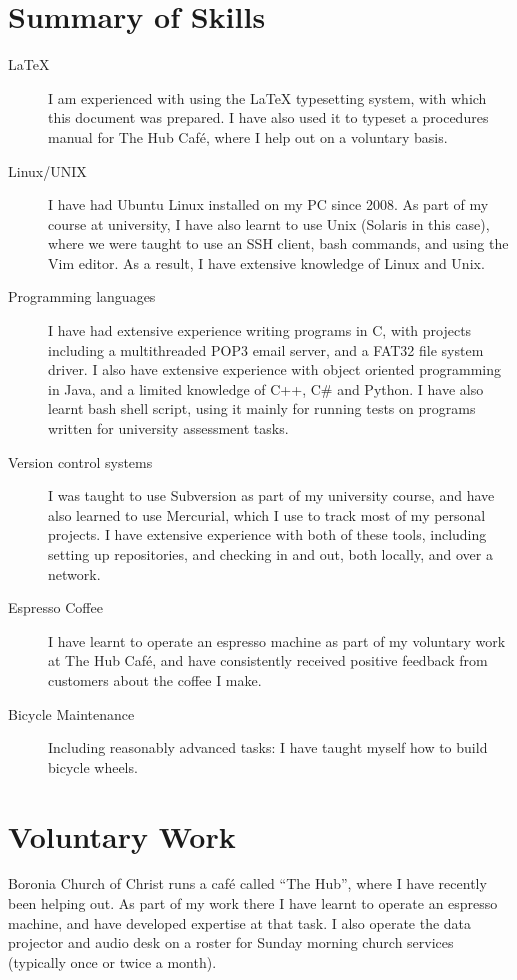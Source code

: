 \documentclass[a4paper]{article}
\begin{document}
\section{Summary of Skills}
\begin{description}
    \item[\LaTeX{}] I am experienced with using the \LaTeX{} typesetting
        system, with which this document was prepared. I have also used
        it to typeset a procedures manual for The Hub Caf\'e, where I
        help out on a voluntary basis.
    \item[Linux/UNIX] I have had Ubuntu Linux installed on my PC since
        2008. As part of my course at university, I have also learnt to
        use Unix (Solaris in this case), where we were taught to use an
        SSH client, bash commands, and using the Vim editor. As a result,
        I have extensive knowledge of Linux and Unix.
    \item[Programming languages] I have had extensive experience writing
        programs in C, with projects including a multithreaded POP3 email 
        server, and a FAT32 file system driver. I also have extensive
        experience with object oriented programming in Java, and a limited
        knowledge of C++, C\# and Python. I have also learnt
        bash shell script, using it mainly for running tests on programs
        written for university assessment tasks.
    \item[Version control systems] I was taught to use Subversion as part
        of my university course, and have also learned to use Mercurial,
        which I use to track most of my personal projects. I have extensive
        experience with both of these tools, including setting up
        repositories, and checking in and out, both locally, and over a
        network.
    \item[Espresso Coffee] I have learnt to operate an espresso machine as
        part of my voluntary work at The Hub Caf\'e, and have consistently
        received positive feedback from customers about the coffee I make.
    \item[Bicycle Maintenance] Including reasonably advanced tasks: I have
        taught myself how to build bicycle wheels.
\end{description}


\section{Voluntary Work}
Boronia Church of Christ runs a caf\'e called ``The Hub'', where I have
recently been helping out. As part of my work there I have learnt to
operate an espresso machine, and have developed expertise at that task. I 
also operate the data projector and audio desk on a roster for Sunday 
morning church services (typically once or twice a month).
\end{document}
